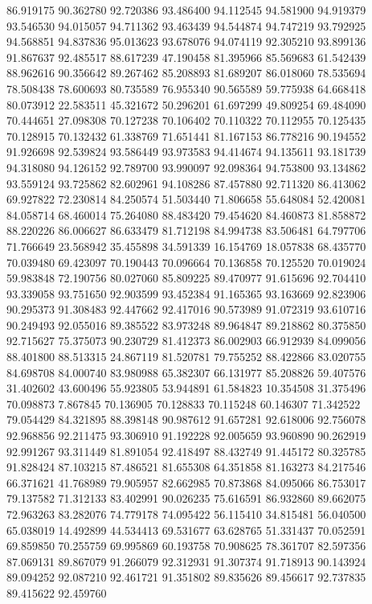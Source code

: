 86.919175
90.362780
92.720386
93.486400
94.112545
94.581900
94.919379
93.546530
94.015057
94.711362
93.463439
94.544874
94.747219
93.792925
94.568851
94.837836
95.013623
93.678076
94.074119
92.305210
93.899136
91.867637
92.485517
88.617239
47.190458
81.395966
85.569683
61.542439
88.962616
90.356642
89.267462
85.208893
81.689207
86.018060
78.535694
78.508438
78.600693
80.735589
76.955340
90.565589
59.775938
64.668418
80.073912
22.583511
45.321672
50.296201
61.697299
49.809254
69.484090
70.444651
27.098308
70.127238
70.106402
70.110322
70.112955
70.125435
70.128915
70.132432
61.338769
71.651441
81.167153
86.778216
90.194552
91.926698
92.539824
93.586449
93.973583
94.414674
94.135611
93.181739
94.318080
94.126152
92.789700
93.990097
92.098364
94.753800
93.134862
93.559124
93.725862
82.602961
94.108286
87.457880
92.711320
86.413062
69.927822
72.230814
84.250574
51.503440
71.806658
55.648084
52.420081
84.058714
68.460014
75.264080
88.483420
79.454620
84.460873
81.858872
88.220226
86.006627
86.633479
81.712198
84.994738
83.506481
64.797706
71.766649
23.568942
35.455898
34.591339
16.154769
18.057838
68.435770
70.039480
69.423097
70.190443
70.096664
70.136858
70.125520
70.019024
59.983848
72.190756
80.027060
85.809225
89.470977
91.615696
92.704410
93.339058
93.751650
92.903599
93.452384
91.165365
93.163669
92.823906
90.295373
91.308483
92.447662
92.417016
90.573989
91.072319
93.610716
90.249493
92.055016
89.385522
83.973248
89.964847
89.218862
80.375850
92.715627
75.375073
90.230729
81.412373
86.002903
66.912939
84.099056
88.401800
88.513315
24.867119
81.520781
79.755252
88.422866
83.020755
84.698708
84.000740
83.980988
65.382307
66.131977
85.208826
59.407576
31.402602
43.600496
55.923805
53.944891
61.584823
10.354508
31.375496
70.098873
7.867845
70.136905
70.128833
70.115248
60.146307
71.342522
79.054429
84.321895
88.398148
90.987612
91.657281
92.618006
92.756078
92.968856
92.211475
93.306910
91.192228
92.005659
93.960890
90.262919
92.991267
93.311449
81.891054
92.418497
88.432749
91.445172
80.325785
91.828424
87.103215
87.486521
81.655308
64.351858
81.163273
84.217546
66.371621
41.768989
79.905957
82.662985
70.873868
84.095066
86.753017
79.137582
71.312133
83.402991
90.026235
75.616591
86.932860
89.662075
72.963263
83.282076
74.779178
74.095422
56.115410
34.815481
56.040500
65.038019
14.492899
44.534413
69.531677
63.628765
51.331437
70.052591
69.859850
70.255759
69.995869
60.193758
70.908625
78.361707
82.597356
87.069131
89.867079
91.266079
92.312931
91.307374
91.718913
90.143924
89.094252
92.087210
92.461721
91.351802
89.835626
89.456617
92.737835
89.415622
92.459760

